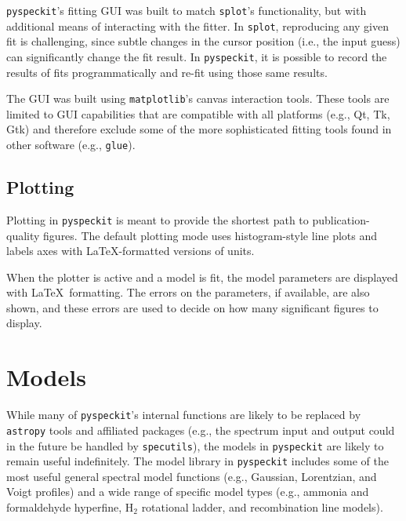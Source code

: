 \documentclass[twocolumn]{aastex62}
\newcommand{\pyspeckit}{\texttt{pyspeckit}\xspace}
\newcommand{\astropy}{\texttt{astropy}\xspace}
\newcommand{\hh}{\ensuremath{\mathrm{H}_2}\xspace}
\begin{document}
\texttt{pyspeckit}'s fitting GUI was built to match \texttt{splot}'s
functionality, but with additional means of interacting with the fitter.  In
\texttt{splot}, reproducing any given fit is challenging, since subtle changes
in the cursor position (i.e., the input guess) can significantly change the fit
result.  In \pyspeckit, it is possible to record the results of fits
programmatically and re-fit using those same results.

The GUI was built using \texttt{matplotlib}'s canvas interaction tools.  These
tools are limited to GUI capabilities that are compatible with all platforms
(e.g., Qt, Tk, Gtk) and therefore exclude some of the more sophisticated fitting
tools found in other software (e.g., \texttt{glue}).

\subsection{Plotting}
Plotting in \pyspeckit is meant to provide the shortest path to
publication-quality figures.  The default plotting mode uses histogram-style
line plots and labels axes with \LaTeX-formatted versions of units.

When the plotter is active and a model is fit, the model parameters are
displayed with \LaTeX~formatting.  The errors on the parameters, if available,
are also shown, and these errors are used to decide on how many significant
figures to display.


\section{Models}
\label{sec:models}
While many of \pyspeckit's internal functions are likely to be replaced by
\astropy tools and affiliated packages (e.g., the spectrum input and output
could in the future be handled by \texttt{specutils}), the models in \pyspeckit
are likely to remain useful indefinitely.  The model library in \pyspeckit
includes some of the most useful general spectral model functions (e.g.,
Gaussian, Lorentzian, and Voigt profiles) and a wide range of specific model
types (e.g., ammonia and formaldehyde hyperfine, \hh rotational ladder, and
recombination line models).
\end{document}
